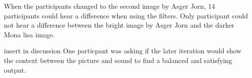 When the participants changed to the second image by Asger Jorn, 14 participants could hear a difference when using the filters. Only participant could not hear a difference between the bright image by Asger Jorn and the darker Mona lisa image. 

\todo insert in discussion {One particpant was asking if the later iteration would show the context between the picture and sound to find a balanced and satisfying output}. 